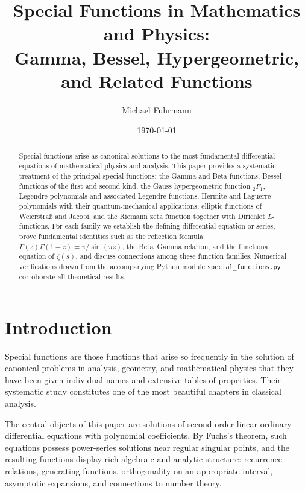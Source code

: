 \documentclass[12pt,a4paper]{amsart}
\author{Michael Fuhrmann}
\date{\today}
\theoremstyle{definition}
\begin{document}
\title{Special Functions in Mathematics and Physics:\\
Gamma, Bessel, Hypergeometric, and Related Functions}

\begin{abstract}
Special functions arise as canonical solutions to the most fundamental differential
equations of mathematical physics and analysis. This paper provides a systematic
treatment of the principal special functions: the Gamma and Beta functions, Bessel
functions of the first and second kind, the Gauss hypergeometric function \({}_2F_1\),
Legendre polynomials and associated Legendre functions, Hermite and Laguerre polynomials
with their quantum-mechanical applications, elliptic functions of Weierstra\ss{} and
Jacobi, and the Riemann zeta function together with Dirichlet \(L\)-functions.
For each family we establish the defining differential equation or series, prove
fundamental identities such as the reflection formula \(\Gamma(z)\Gamma(1-z)=\pi/\sin(\pi z)\),
the Beta--Gamma relation, and the functional equation of \(\zeta(s)\), and discuss
connections among these function families.  Numerical verifications drawn from the
accompanying Python module \texttt{special\_functions.py} corroborate all theoretical
results.
\end{abstract}

\maketitle

\tableofcontents

\section{Introduction}

Special functions are those functions that arise so frequently in the solution of canonical
problems in analysis, geometry, and mathematical physics that they have been given
individual names and extensive tables of properties.  Their systematic study constitutes
one of the most beautiful chapters in classical analysis.

The central objects of this paper are solutions of second-order linear ordinary
differential equations with polynomial coefficients.  By Fuchs's theorem, such equations
possess power-series solutions near regular singular points, and the resulting functions
display rich algebraic and analytic structure: recurrence relations, generating functions,
orthogonality on an appropriate interval, asymptotic expansions, and connections to
number theory.
\end{document}
